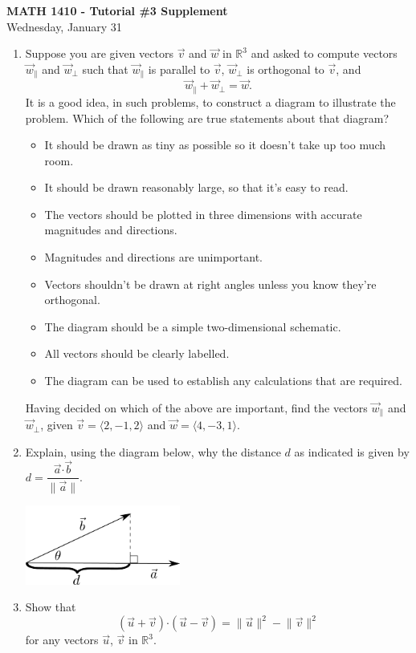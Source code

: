 \documentclass[12pt]{article}
\newcommand{\len}[1]{\lVert #1\rVert}
\newcommand{\R}{\mathbb{R}}
\newcommand{\dotp}{\boldsymbol{\cdot}}
\begin{document}
\author{Instructor: Sean Fitzpatrick}
\thispagestyle{empty}
\begin{center}
{\bf MATH 1410 - Tutorial \#3 Supplement}\\
Wednesday, January 31
\end{center}
\begin{enumerate}
	\item Suppose you are given vectors $\vec{v}$ and $\vec{w}$ in $\R^3$ and asked to compute vectors $\vec{w}_\parallel$ and $\vec{w}_\bot$ such that $\vec{w}_\parallel$ is parallel to $\vec{v}$, $\vec{w}_\bot$ is orthogonal to $\vec{v}$, and 
	\[
	\vec{w}_\parallel+\vec{w}_\bot=\vec{w}.
	\]   
    It is a good idea, in such problems, to construct a diagram to illustrate the problem. Which of the following are true statements about that diagram?
    \begin{itemize}
    \item It should be drawn as tiny as possible so it doesn't take up too much room.
    \item It should be drawn reasonably large, so that it's easy to read.
    \item The vectors should be plotted in three dimensions with accurate magnitudes and directions.
    \item Magnitudes and directions are unimportant.
    \item Vectors shouldn't be drawn at right angles unless you know they're orthogonal.
    \item The diagram should be a simple two-dimensional schematic.
    \item All vectors should be clearly labelled.
    \item The diagram can be used to establish any calculations that are required.
    \end{itemize}
    
    \medskip
    
    Having decided on which of the above are important, find the vectors $\vec{w}_\parallel$ and $\vec{w}_\bot$, given $\vec{v}=\langle 2, -1, 2\rangle$ and $\vec{w} = \langle 4,-3,1\rangle$.
    \item Explain, using the diagram below, why the distance $d$ as indicated is given by $d = \dfrac{\vec{a}\dotp \vec{b}}{\len{\vec{a}}}$.
    
    \begin{flushleft}
    \includegraphics[width=2in]{T3-proj}
    \end{flushleft}
    
    \item Show that
    \[
    (\vec{u}+\vec{v})\dotp (\vec{u}-\vec{v}) = \len{\vec{u}}^2-\len{\vec{v}}^2
    \]
    for any vectors $\vec{u}$, $\vec{v}$ in $\R^3$.
\end{enumerate}
  
\end{document}
